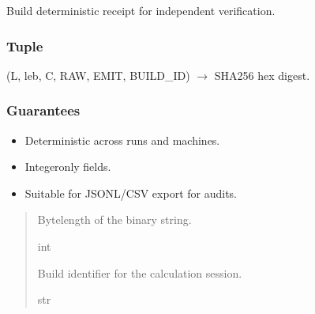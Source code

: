 \documentclass[letterpaper,10pt,english]{sphinxmanual}
\begin{document}
\begin{fulllineitems}
\label{\detokenize{clf_calculator:id6}}
\pysigstartsignatures
\pysiglinewithargsret
{}
{\sphinxparamcomma {}}
{}
\pysigstopsignatures
\sphinxAtStartPar
Build deterministic receipt for independent verification.


\subsubsection{Tuple}
\label{\detokenize{clf_calculator:id7}}
\sphinxAtStartPar
(L, leb, C, RAW, EMIT, BUILD\_ID)  \(\rightarrow\) SHA256 hex digest.


\subsubsection{Guarantees}
\label{\detokenize{clf_calculator:id8}}\begin{itemize}
\item {} 
\sphinxAtStartPar
Deterministic across runs and machines.

\item {} 
\sphinxAtStartPar
Integer\sphinxhyphen{}only fields.

\item {} 
\sphinxAtStartPar
Suitable for JSONL/CSV export for audits.

\end{itemize}
\begin{quote}\begin{description}
\sphinxAtStartPar
{}

\sphinxAtStartPar
Byte\sphinxhyphen{}length of the binary string.

\sphinxAtStartPar
int

\sphinxAtStartPar
{}

\sphinxAtStartPar
Build identifier for the calculation session.

\sphinxAtStartPar
str


\end{description}
\end{quote}
\end{fulllineitems}
\end{document}
